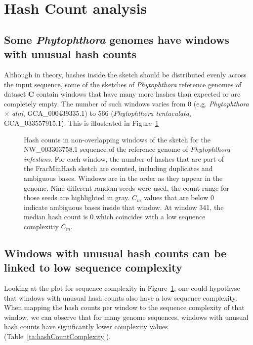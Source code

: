 \section{Hash Count analysis}
\subsection*{Some \textit{Phytophthora} genomes have windows with unusual hash
counts} 

Although in theory, hashes inside the sketch should be distributed evenly across
the input sequence, some of the sketches of \textit{Phytophthora} reference
genomes of dataset \textbf{C} contain windows that have many more hashes than
expected or are completely empty. The number of such windows varies from 0 (e.g.
\textit{Phytophthora $\times$  alni}, GCA\_000439335.1) to 566
(\textit{Phytophthora tentaculata}, GCA\_033557915.1). This is illustrated in
Figure~\ref{fig:sketchCountsOverview} 

\begin{figure}
  \centering
  
  \caption[Hash counts in non-overlapping windows of the sketch for the
  NW\_003303758.1 sequence of the reference genome of \textit{Phytophthora
  infestans}]{Hash counts in non-overlapping windows of the sketch for the
  NW\_003303758.1 sequence of the reference genome of \textit{Phytophthora
  infestans}. For each window, the number of hashes that are part of the
  FracMinHash sketch are counted, including duplicates and ambiguous bases.
  Windows are in the order as they appear in the genome. Nine different random
  seeds were used, the count range for those seeds are highlighted in gray.
  $C_m$ values that are below $0$ indicate ambiguous bases inside that window.
  At window 341, the median hash count is $0$ which coincides with a low
  sequence complexitiy $C_m$.}
  \label{fig:sketchCountsOverview}
\end{figure}

\subsection*{Windows with unusual hash counts can be linked to low sequence complexity}
Looking at the plot for sequence complexity in
Figure~\ref{fig:sketchCountsOverview}, one could hypothyse that windows with
unusual hash counts also have a low sequence complexity. When mapping the hash
counts per window to the sequence complexity of that window, we can observe that
for many genome sequences, windows with unusual hash counts have significantly
lower complexity values (Table~\ref{ta:hashCountComplexity}).

